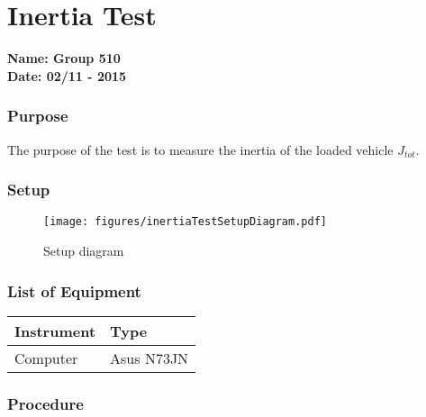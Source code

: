 \pagebreak
\section{Inertia Test}
\nopagebreak
\textbf{Name: Group 510}\\
\textbf{Date: 02/11 - 2015}

\subsubsection{Purpose}
The purpose of the test is to measure the inertia of the loaded vehicle $J_{tot}$.

\subsubsection{Setup}
\begin{figure}[H]
	\centering
	\texttt{[image: figures/inertiaTestSetupDiagram.pdf]}
	\caption{Setup diagram}
	\label{inertiaTestSetupDiagram}
\end{figure}

\subsubsection{List of Equipment}

\begin{table}[H]
\begin{tabular}{|p{10cm}|p{4cm}|}
\hline%
  \textbf{Instrument}                     &  \textbf{Type}       \\
\hline%
  Computer                                &  Asus N73JN    \\
\hline %
\end{tabular}
\end{table}


\subsubsection{Procedure}

